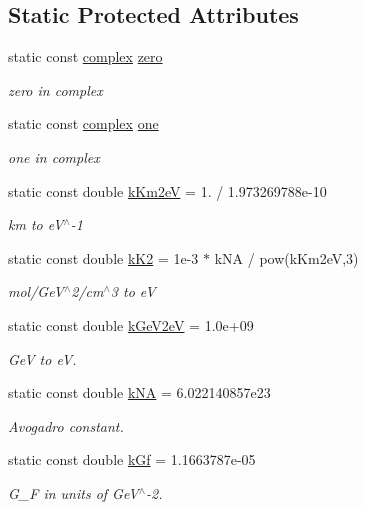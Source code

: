 \subsection*{Static Protected Attributes}
\begin{DoxyCompactItemize}
\item 
static const \hyperlink{classOscProb_1_1PMNS__Base_ae86ec4718808ce9d02e5f5b4226714ab}{complex} \hyperlink{classOscProb_1_1PMNS__Base_a5c31ed4593cf95feb36fb80c1850d25e}{zero}
\begin{DoxyCompactList}\small\item\em zero in complex \end{DoxyCompactList}\item 
static const \hyperlink{classOscProb_1_1PMNS__Base_ae86ec4718808ce9d02e5f5b4226714ab}{complex} \hyperlink{classOscProb_1_1PMNS__Base_ab64aab27448a5aca27565c991a9d173e}{one}
\begin{DoxyCompactList}\small\item\em one in complex \end{DoxyCompactList}\item 
static const double \hyperlink{classOscProb_1_1PMNS__Base_a382ddd7b76ca89b43f22614a2ea7327b}{k\+Km2eV} = 1. / 1.\+973269788e-\/10
\begin{DoxyCompactList}\small\item\em km to e\+V$^\wedge$-\/1 \end{DoxyCompactList}\item 
static const double \hyperlink{classOscProb_1_1PMNS__Base_a326fc5016d7dd7ce05682c06cdcb6d94}{k\+K2} = 1e-\/3 $\ast$ k\+N\+A / pow(k\+Km2e\+V,3)
\begin{DoxyCompactList}\small\item\em mol/\+Ge\+V$^\wedge$2/cm$^\wedge$3 to eV \end{DoxyCompactList}\item 
static const double \hyperlink{classOscProb_1_1PMNS__Base_ad36a0a6bf58d6ec093d3947784bd89e9}{k\+Ge\+V2eV} = 1.\+0e+09
\begin{DoxyCompactList}\small\item\em GeV to eV. \end{DoxyCompactList}\item 
static const double \hyperlink{classOscProb_1_1PMNS__Base_a69355e770b89e99437c2b8a66e48eeb9}{k\+NA} = 6.\+022140857e23
\begin{DoxyCompactList}\small\item\em Avogadro constant. \end{DoxyCompactList}\item 
static const double \hyperlink{classOscProb_1_1PMNS__Base_a7f26a3456128234b2ae6cc9141a6532f}{k\+Gf} = 1.\+1663787e-\/05
\begin{DoxyCompactList}\small\item\em G\+\_\+F in units of Ge\+V$^\wedge$-\/2. \end{DoxyCompactList}\end{DoxyCompactItemize}


